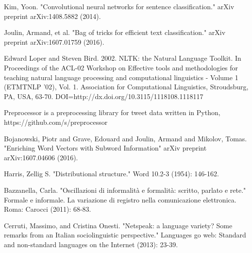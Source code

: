 \begin{thebibliography}{1}

Kim, Yoon. "Convolutional neural networks for sentence classification." arXiv preprint arXiv:1408.5882 (2014).

Joulin, Armand, et al. "Bag of tricks for efficient text classification." arXiv preprint arXiv:1607.01759 (2016).

Edward Loper and Steven Bird. 2002. NLTK: the Natural Language Toolkit. In Proceedings of the ACL-02 Workshop on Effective tools and methodologies for teaching natural language processing and computational linguistics - Volume 1 (ETMTNLP '02), Vol. 1. Association for Computational Linguistics, Stroudsburg, PA, USA, 63-70. DOI=http://dx.doi.org/10.3115/1118108.1118117

Preprocessor is a preprocessing library for tweet data written in Python, https://github.com/s/preprocessor

Bojanowski, Piotr and Grave, Edouard and Joulin, Armand and Mikolov, Tomas. "Enriching Word Vectors with Subword Information" arXiv preprint arXiv:1607.04606 (2016).

Harris, Zellig S. "Distributional structure." Word 10.2-3 (1954): 146-162.

Bazzanella, Carla. "Oscillazioni di informalità e formalità: scritto, parlato e rete." Formale e informale. La variazione di registro nella comunicazione elettronica. Roma: Carocci (2011): 68-83.


Cerruti, Massimo, and Cristina Onesti. "Netspeak: a language variety? Some remarks from an Italian sociolinguistic perspective." Languages go web: Standard and non-standard languages on the Internet (2013): 23-39.

\end{thebibliography}